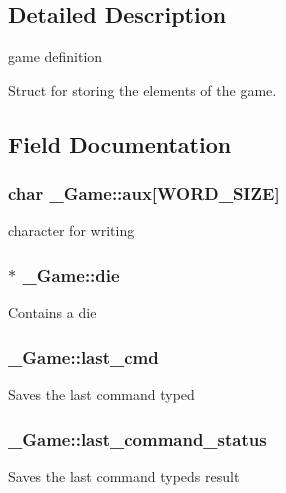\subsection{Detailed Description}
game definition 

Struct for storing the elements of the game. 

\subsection{Field Documentation}
\subsubsection[{\texorpdfstring{aux}{aux}}]{\setlength{\rightskip}{0pt plus 5cm}char \+\_\+\+Game\+::aux\mbox{[}{\bf W\+O\+R\+D\+\_\+\+S\+I\+ZE}\mbox{]}}\hypertarget{struct__Game_a3aefc7ea654ec68acee732527bb660e8}{}\label{struct__Game_a3aefc7ea654ec68acee732527bb660e8}
character for writing 
\subsubsection[{\texorpdfstring{die}{die}}]{$\ast$ \+\_\+\+Game\+::die}\hypertarget{struct__Game_a0d6009b5dcb080489c192a9198fa7d46}{}\label{struct__Game_a0d6009b5dcb080489c192a9198fa7d46}
Contains a die 
\subsubsection[{\texorpdfstring{last\+\_\+cmd}{last_cmd}}]{ \+\_\+\+Game\+::last\+\_\+cmd}\hypertarget{struct__Game_a27727b50ea0904a1fe9e1c55c27f2cf1}{}\label{struct__Game_a27727b50ea0904a1fe9e1c55c27f2cf1}
Saves the last command typed 
\subsubsection[{\texorpdfstring{last\+\_\+command\+\_\+status}{last_command_status}}]{ \+\_\+\+Game\+::last\+\_\+command\+\_\+status}\hypertarget{struct__Game_ac553fd756c47abf8e7066c20f6b7dc82}{}\label{struct__Game_ac553fd756c47abf8e7066c20f6b7dc82}
Saves the last command typed\textquotesingle{}s result 
